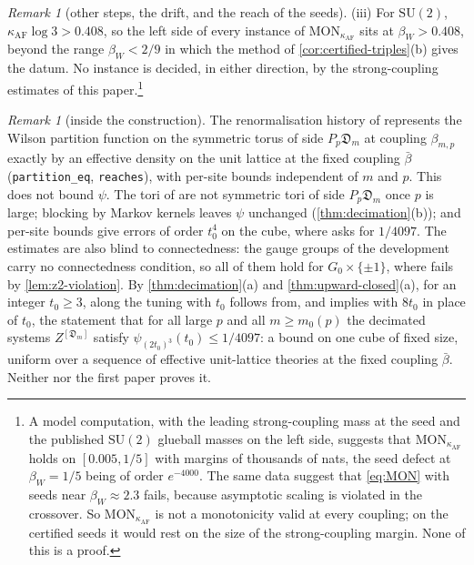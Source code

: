 \documentclass[11pt,a4paper]{amsart}
\theoremstyle{definition}
\theoremstyle{remark}
\newtheorem{remark}[theorem]{Remark}
\numberwithin{equation}{section}
\newcommand{\SU}{\mathrm{SU}}              %
\newcommand{\dconst}{\frac{1}{4097}}       %
\newcommand{\dconstinl}{1/4097}            %
\newcommand{\Mcirc}{\text{\upshape(M$^{\circ}$)}}   %
\newcommand{\tzero}{t_0}                   %
\newcommand{\Den}{\mathfrak D}            %
\newcommand{\betaW}{\beta_{W}}             %
\begin{document}
\begin{remark}[other steps, the drift, and the reach of the seeds]
(iii) For $\SU(2)$, $\kappa_{\mathrm{AF}}\log3>0.408$, so the left side of every instance of $\mathrm{MON}_{\kappa_{\mathrm{AF}}}$ sits at $\betaW>0.408$, beyond the range $\betaW<2/9$ in which the method of \cref{cor:certified-triples}(b) gives the datum. No instance is decided, in either direction, by the strong-coupling estimates of this paper.\footnote{A model computation, with the leading strong-coupling mass at the seed and the published $\SU(2)$ glueball masses \cite{teper1998} on the left side, suggests that $\mathrm{MON}_{\kappa_{\mathrm{AF}}}$ holds on $[0.005,1/5]$ with margins of thousands of nats, the seed defect at $\betaW=1/5$ being of order $e^{-4000}$. The same data suggest that \eqref{eq:MON} with seeds near $\betaW\approx2.3$ fails, because asymptotic scaling is violated in the crossover. So $\mathrm{MON}_{\kappa_{\mathrm{AF}}}$ is not a monotonicity valid at every coupling; on the certified seeds it would rest on the size of the strong-coupling margin. None of this is a proof.}
\end{remark}

\begin{remark}[inside the construction]\label{rem:oai-internals}
The renormalisation history of \cite{openaiym} represents the Wilson partition function on the symmetric torus of side $P_p\Den_m$ at coupling $\beta_{m,p}$ exactly by an effective density on the unit lattice at the fixed coupling $\bar\beta$ (\texttt{partition\_eq}, \texttt{reaches}), with per-site bounds independent of $m$ and $p$. This does not bound $\psi$. The tori of \Mcirc{} are not symmetric tori of side $P_p\Den_m$ once $p$ is large; blocking by Markov kernels leaves $\psi$ unchanged (\cref{thm:decimation}(b)); and per-site bounds give errors of order $\tzero^4$ on the cube, where \Mcirc{} asks for $\dconstinl$. The estimates are also blind to connectedness: the gauge groups of the development carry no connectedness condition, so all of them hold for $G_0\times\{\pm1\}$, where \Mcirc{} fails by \cref{lem:z2-violation}. By \cref{thm:decimation}(a) and \cref{thm:upward-closed}(a), for an integer $\tzero\ge3$, \Mcirc{} along the tuning with $\tzero$ follows from, and implies with $8\tzero$ in place of $\tzero$, the statement that for all large $p$ and all $m\ge m_0(p)$ the decimated systems $Z^{[\Den_m]}$ satisfy $\psi_{(2\tzero)^3}(\tzero)\le\dconstinl$: a bound on one cube of fixed size, uniform over a sequence of effective unit-lattice theories at the fixed coupling $\bar\beta$. Neither \cite{openaiym} nor the first paper proves it.
\end{remark}
\end{document}
